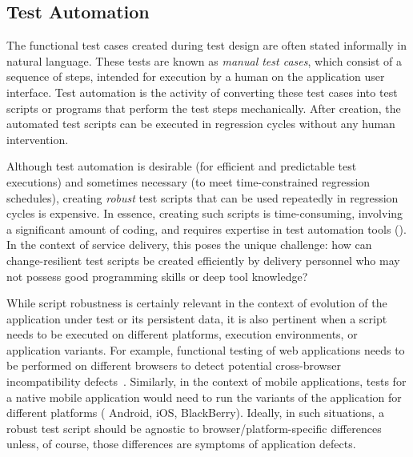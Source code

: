 

\subsection{Test Automation}
\label{sec:test-automation}

The functional test cases created during test design are often stated informally
in natural language. These tests are known as \textit{manual test cases}, which
consist of a sequence of steps, intended for execution by a human on the
application user interface.  Test automation is the activity of converting these
test cases into test scripts or programs that perform the test steps
mechanically. After creation, the automated test scripts can be executed in
regression cycles without any human intervention.

Although test automation is desirable (\eg for efficient and predictable test
executions) and sometimes necessary (\eg to meet time-constrained regression
schedules), creating \textit{robust} test scripts that can be used repeatedly in
regression cycles is expensive. In essence, creating such scripts is
time-consuming, involving a significant amount of coding, and requires expertise
in test automation tools (\eg \cite{hpqtp,ibmrft,selenium}). In the context of
service delivery, this poses the unique challenge: how can change-resilient test
scripts be created efficiently by delivery personnel who may not possess good
programming skills or deep tool knowledge?


While script robustness is certainly relevant in the context of evolution of the
application under test or its persistent data, it is also pertinent when a
script needs to be executed on different platforms, execution environments, or
application variants. For example, functional testing of web applications needs
to be performed on different browsers to detect potential cross-browser
incompatibility
defects~\cite{Choudhary2010,Shauvik:2012,Choudhary:2013,Mesbah:2011}. Similarly,
in the context of mobile applications, tests for a native mobile application
would need to run the variants of the application for different platforms (\eg
Android, iOS, BlackBerry). Ideally, in such situations, a robust test script
should be agnostic to browser/platform-specific differences unless, of course,
those differences are symptoms of application defects.

